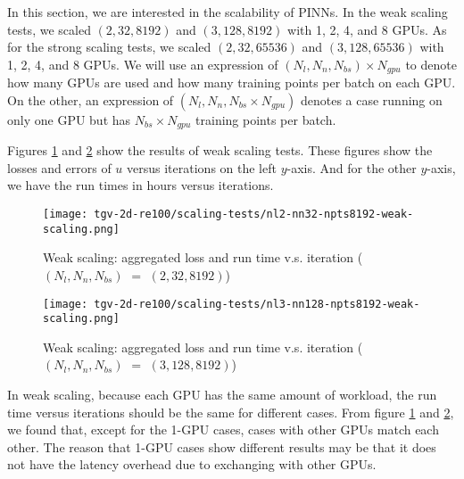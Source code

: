
In this section, we are interested in the scalability of PINNs.
In the weak scaling tests, we scaled $(2, 32, 8192)$ and $(3, 128, 8192)$ with 1, 2, 4, and 8 GPUs. 
As for the strong scaling tests, we scaled $(2, 32, 65536)$ and $(3, 128, 65536)$ with 1, 2, 4, and 8 GPUs. 
We will use an expression of $(N_l, N_n, N_{bs})\times N_{gpu}$ to denote how many GPUs are used and how many training points per batch on each GPU.
On the other, an expression of $(N_l, N_n, N_{bs}\times N_{gpu})$ denotes a case running on only one GPU but has $N_{bs}\times N_{gpu}$ training points per batch.

Figures \ref{fig:nl2-nn32-npts8192-weak-scaling} and \ref{fig:nl3-nn128-npts8192-weak-scaling} show the results of weak scaling tests.
These figures show the losses and errors of $u$ versus iterations on the left $y$-axis.
And for the other $y$-axis, we have the run times in hours versus iterations.

\begin{figure}[hbt!]
    \centering%
    \texttt{[image: tgv-2d-re100/scaling-tests/nl2-nn32-npts8192-weak-scaling.png]}
    \caption[%
        Weak scaling: aggregated loss and run time v.s. iteration ($(N_l, N_n, N_{bs})$ $=$ $(2, 32, 8192)$)%
    ]{%
        Weak scaling: aggregated loss and run time v.s. iteration ($(N_l, N_n, N_{bs})$ $=$ $(2, 32, 8192)$)%
    }\label{fig:nl2-nn32-npts8192-weak-scaling}
\end{figure}

\begin{figure}[hbt!]
    \centering%
    \texttt{[image: tgv-2d-re100/scaling-tests/nl3-nn128-npts8192-weak-scaling.png]}
    \caption[%
        Weak scaling: aggregated loss and run time v.s. iteration ($(N_l, N_n, N_{bs})$ $=$ $(3, 128, 8192)$)%
    ]{%
        Weak scaling: aggregated loss and run time v.s. iteration ($(N_l, N_n, N_{bs})$ $=$ $(3, 128, 8192)$)%
    }\label{fig:nl3-nn128-npts8192-weak-scaling}
\end{figure}

In weak scaling, because each GPU has the same amount of workload, the run time versus iterations should be the same for different cases.
From figure \ref{fig:nl2-nn32-npts8192-weak-scaling} and \ref{fig:nl3-nn128-npts8192-weak-scaling}, we found that, except for the 1-GPU cases, cases with other GPUs match each other.
The reason that 1-GPU cases show different results may be that it does not have the latency overhead due to exchanging with other GPUs.

